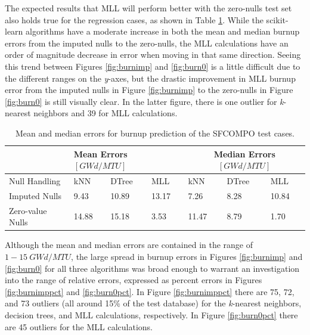The expected results that \gls{MLL} will perform better with the zero-nulls
test set also holds true for the regression cases, as shown in Table
\ref{tbl:sfcoburn}.  While the scikit-learn algorithms have a moderate increase
in both the mean and median burnup errors from the imputed nulls to the
zero-nulls, the \gls{MLL} calculations have an order of magnitude decrease in
error when moving in that same direction.  Seeing this trend between Figures
\ref{fig:burnimp} and \ref{fig:burn0} is a little difficult due to the
different ranges on the \textit{y}-axes, but the drastic improvement in
\gls{MLL} burnup error from the imputed nulls in Figure \ref{fig:burnimp} to
the zero-nulls in Figure \ref{fig:burn0} is still visually clear. In the latter
figure, there is one outlier for \textit{k}-nearest neighbors and 39 for
\gls{MLL} calculations.

\begin{table}[!htb]
  \centering
  \begin{tabular}{@{}m{1.5in}llllll@{}}
    \toprule
                     & \multicolumn{3}{m{2in}}{Mean Errors $[GWd/MTU]$} 
                     & \multicolumn{3}{c}{Median Errors $[GWd/MTU]$} 
                     \\ \toprule
    Null Handling    & kNN   & DTree & MLL   & kNN   & DTree & MLL    \\ \midrule
    Imputed Nulls    & 9.43  & 10.89 & 13.17 & 7.26  & 8.28  & 10.84  \\
    Zero-value Nulls & 14.88 & 15.18 & 3.53  & 11.47 & 8.79  & 1.70   \\ \bottomrule
  \end{tabular}
  \caption[Performance of burnup regression of \acrshort{SFCOMPO} entries]
          {Mean and median errors for burnup prediction of the 
          \acrshort{SFCOMPO} test cases.}
  \label{tbl:sfcoburn}
\end{table}

Although the mean and median errors are contained in the range of $1-15\:
GWd/MTU$, the large spread in burnup errors in Figures \ref{fig:burnimp} and
\ref{fig:burn0} for all three algorithms was broad enough to warrant an
investigation into the range of relative errors, expressed as percent errors in
Figures \ref{fig:burnimppct} and \ref{fig:burn0pct}.  In Figure
\ref{fig:burnimppct} there are 75, 72, and 73 outliers (all around 15\% of the
test database) for the \textit{k}-nearest neighbors, decision trees, and
\gls{MLL} calculations, respectively.  In Figure \ref{fig:burn0pct} there are
45 outliers for the \gls{MLL} calculations.


